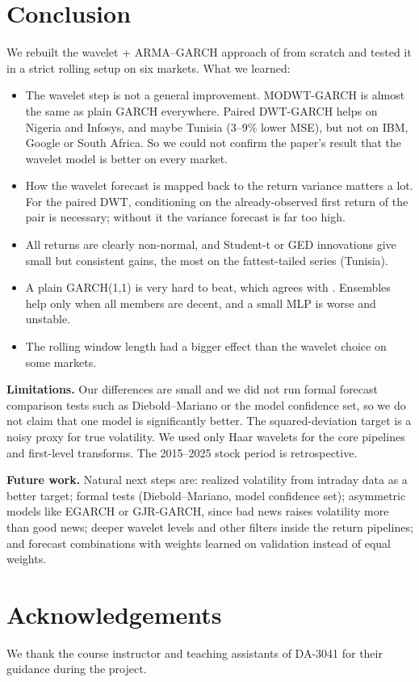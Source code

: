 \documentclass{article}
\begin{document}
\section{Conclusion}
\label{sec:conc}

We rebuilt the wavelet + ARMA--GARCH approach of \citet{ismail2016} from scratch and tested it in a strict rolling setup on six markets. What we learned:
\begin{itemize}
\item The wavelet step is not a general improvement. MODWT-GARCH is almost the same as plain GARCH everywhere. Paired DWT-GARCH helps on Nigeria and Infosys, and maybe Tunisia (3--9\% lower MSE), but not on IBM, Google or South Africa. So we could not confirm the paper's result that the wavelet model is better on every market.
\item How the wavelet forecast is mapped back to the return variance matters a lot. For the paired DWT, conditioning on the already-observed first return of the pair is necessary; without it the variance forecast is far too high.
\item All returns are clearly non-normal, and Student-t or GED innovations give small but consistent gains, the most on the fattest-tailed series (Tunisia).
\item A plain GARCH(1,1) is very hard to beat, which agrees with \citet{hansen2005}. Ensembles help only when all members are decent, and a small MLP is worse and unstable.
\item The rolling window length had a bigger effect than the wavelet choice on some markets.
\end{itemize}

\textbf{Limitations.} Our differences are small and we did not run formal forecast comparison tests such as Diebold--Mariano or the model confidence set, so we do not claim that one model is significantly better. The squared-deviation target is a noisy proxy for true volatility. We used only Haar wavelets for the core pipelines and first-level transforms. The 2015--2025 stock period is retrospective.

\textbf{Future work.} Natural next steps are: realized volatility from intraday data as a better target; formal tests (Diebold--Mariano, model confidence set); asymmetric models like EGARCH or GJR-GARCH, since bad news raises volatility more than good news; deeper wavelet levels and other filters inside the return pipelines; and forecast combinations with weights learned on validation instead of equal weights.

\section*{Acknowledgements}
We thank the course instructor and teaching assistants of DA-3041 for their guidance during the project.



\end{document}
